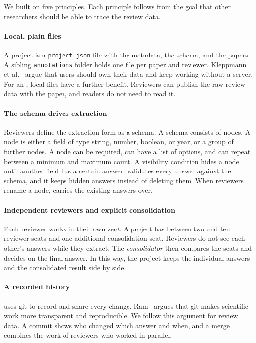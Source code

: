 We built \SaiLoR on five principles.
Each principle follows from the goal that other researchers should be able to trace the review data.

\paragraph{Local, plain files}
A project is a \texttt{project.json} file with the metadata, the schema, and the papers.
A sibling \texttt{annotations} folder holds one file per paper and reviewer.
Kleppmann et al.~\cite{kleppmann2019local} argue that users should own their data and keep working without a server.
For an \SLR, local files have a further benefit.
Reviewers can publish the raw review data with the paper, and readers do not need \SaiLoR to read it.

\paragraph{The schema drives extraction}
Reviewers define the extraction form as a schema.
A schema consists of nodes.
A node is either a field of type string, number, boolean, or year, or a group of further nodes.
A node can be required, can have a list of options, and can repeat between a minimum and maximum count.
A visibility condition hides a node until another field has a certain answer.
\SaiLoR validates every answer against the schema, and it keeps hidden answers instead of deleting them.
When reviewers rename a node, \SaiLoR carries the existing answers over.

\paragraph{Independent reviewers and explicit consolidation}
Each reviewer works in their own \emph{seat}.
A project has between two and ten reviewer seats and one additional consolidation seat.
Reviewers do not see each other's answers while they extract.
The \emph{consolidator} then compares the seats and decides on the final answer.
In this way, the project keeps the individual answers and the consolidated result side by side.

\paragraph{A recorded history}
\SaiLoR uses git to record and share every change.
Ram~\cite{ram2013git} argues that git makes scientific work more transparent and reproducible.
We follow this argument for review data.
A commit shows who changed which answer and when, and a merge combines the work of reviewers who worked in parallel.

